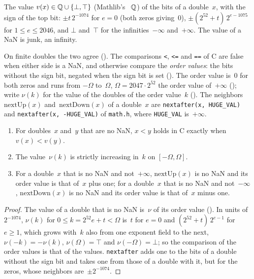 \begin{definition}\label{def:doubleValue}
  \leanok
  The value $v(x) \in \mathbb{Q} \cup \{\bot, \top\}$ (Mathlib's ~$\mathbb{Q}$) of the bits of a
  double~$x$, with the sign of the top bit: $\pm t\,2^{-1074}$ for $e = 0$ (both zeros giving~$0$),
  $\pm(2^{52} + t)\,2^{e - 1075}$ for $1 \le e \le 2046$, and $\bot$ and~$\top$ for the
  infinities~$-\infty$ and~$+\infty$. The value of a NaN is junk, an infinity.
\end{definition}

On finite doubles the two agree (). The comparisons
\texttt{<}, \texttt{<=} and \texttt{==} of C are false when either side is a NaN, and otherwise
compare the \emph{order values}: the bits without the sign bit, negated when the sign bit is set
(). The order value is~$0$ for both zeros and runs from $-\Omega$
to~$\Omega$, $\Omega = 2047 \cdot 2^{52}$ the order value of~$+\infty$
(); write $\nu(k)$ for the value of the doubles of the order
value~$k$
(). The neighbors $\mathrm{nextUp}(x)$
and~$\mathrm{nextDown}(x)$ of a double~$x$ are \texttt{nextafter(x, HUGE\_VAL)} and
\texttt{nextafter(x, -HUGE\_VAL)} of \texttt{math.h}, where \texttt{HUGE\_VAL} is~$+\infty$.

\begin{lemma}\label{lem:Double.lt_eq_true_iff}
  \leanok
  \begin{enumerate}
    \item For doubles~$x$ and~$y$ that are no NaN, $x < y$ holds in C exactly when $v(x) < v(y)$.
    \item The value~$\nu(k)$ is strictly increasing in~$k$ on $[-\Omega, \Omega]$.
    \item For a double~$x$ that is no NaN and not~$+\infty$, $\mathrm{nextUp}(x)$ is no NaN and its
      order value is that of~$x$ plus one; for a double~$x$ that is no NaN and not~$-\infty$,
      $\mathrm{nextDown}(x)$ is no NaN and its order value is that of~$x$ minus one.
  \end{enumerate}
\end{lemma}

\begin{proof}
  \leanok
  The value of a double that is no NaN is~$\nu$ of its order value
  (). In units of~$2^{-1074}$, $\nu(k)$ for
  $0 \le k = 2^{52}e + t < \Omega$ is~$t$ for $e = 0$ and $(2^{52} + t)\,2^{e - 1}$ for $e \ge 1$,
  which grows with~$k$ also from one exponent field to the next, $\nu(-k) = -\nu(k)$,
  $\nu(\Omega) = \top$
  and $\nu(-\Omega) = \bot$; so the comparison of the order values is that of the values.
  \texttt{nextafter} adds one to the bits of a double without the sign bit and takes one from those
  of a double with it, but for the zeros, whose neighbors are~$\pm 2^{-1074}$.
\end{proof}

